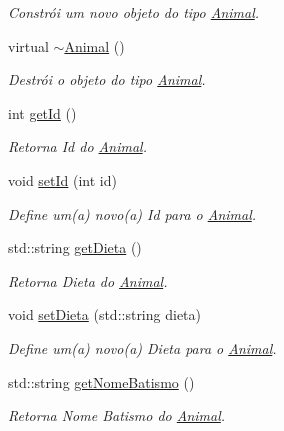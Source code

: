 \begin{DoxyCompactItemize}
\begin{DoxyCompactList}\small\item\em Constrói um novo objeto do tipo \hyperlink{classAnimal}{Animal}. \end{DoxyCompactList}\item 
\mbox{\label{classAnimal_a476af25adde5f0dfa688129c8f86fa5c}} 
virtual \hyperlink{classAnimal_a476af25adde5f0dfa688129c8f86fa5c}{$\sim$\+Animal} ()
\begin{DoxyCompactList}\small\item\em Destrói o objeto do tipo \hyperlink{classAnimal}{Animal}. \end{DoxyCompactList}\item 
int \hyperlink{classAnimal_a2c27e56355bc2b40d65250da2bb8a102}{get\+Id} ()
\begin{DoxyCompactList}\small\item\em Retorna Id do \hyperlink{classAnimal}{Animal}. \end{DoxyCompactList}\item 
void \hyperlink{classAnimal_af5a262e8a6e04632a48307101494925c}{set\+Id} (int id)
\begin{DoxyCompactList}\small\item\em Define um(a) novo(a) Id para o \hyperlink{classAnimal}{Animal}. \end{DoxyCompactList}\item 
std\+::string \hyperlink{classAnimal_a6fcb9a0b8debecb58ca20dbf88bce329}{get\+Dieta} ()
\begin{DoxyCompactList}\small\item\em Retorna Dieta do \hyperlink{classAnimal}{Animal}. \end{DoxyCompactList}\item 
void \hyperlink{classAnimal_a1b6ae4e4360c2a3b15c1759a654ef84b}{set\+Dieta} (std\+::string dieta)
\begin{DoxyCompactList}\small\item\em Define um(a) novo(a) Dieta para o \hyperlink{classAnimal}{Animal}. \end{DoxyCompactList}\item 
std\+::string \hyperlink{classAnimal_aee0219bd596f0af49fa51fcdad29a1a7}{get\+Nome\+Batismo} ()
\begin{DoxyCompactList}\small\item\em Retorna Nome Batismo do \hyperlink{classAnimal}{Animal}. \end{DoxyCompactList}\item 

\end{DoxyCompactItemize}
